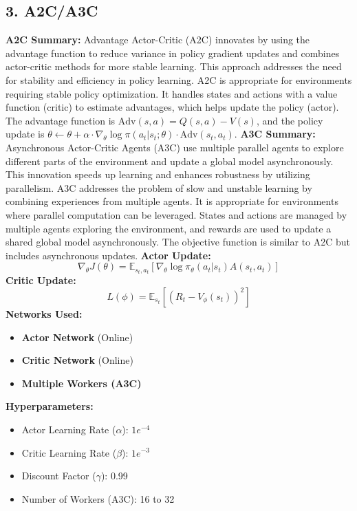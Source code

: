\documentclass[a4paper,10pt]{article}
\begin{document}
\begin{multicols}{2}
\section*{3. A2C/A3C}
\textbf{A2C Summary:} Advantage Actor-Critic (A2C) innovates by using the advantage function to reduce variance in policy gradient updates and combines actor-critic methods for more stable learning. This approach addresses the need for stability and efficiency in policy learning. A2C is appropriate for environments requiring stable policy optimization. It handles states and actions with a value function (critic) to estimate advantages, which helps update the policy (actor). The advantage function is \( \text{Adv}(s, a) = Q(s, a) - V(s) \), and the policy update is \( \theta \leftarrow \theta + \alpha \cdot \nabla_\theta \log \pi(a_t | s_t; \theta) \cdot \text{Adv}(s_t, a_t) \).
\textbf{A3C Summary:} Asynchronous Actor-Critic Agents (A3C) use multiple parallel agents to explore different parts of the environment and update a global model asynchronously. This innovation speeds up learning and enhances robustness by utilizing parallelism. A3C addresses the problem of slow and unstable learning by combining experiences from multiple agents. It is appropriate for environments where parallel computation can be leveraged. States and actions are managed by multiple agents exploring the environment, and rewards are used to update a shared global model asynchronously. The objective function is similar to A2C but includes asynchronous updates.
\textbf{Actor Update:}
\[
\nabla_\theta J(\theta) = \mathbb{E}_{s_t, a_t} \left[ \nabla_\theta \log \pi_\theta(a_t | s_t) A(s_t, a_t) \right]
\]
\textbf{Critic Update:}
\[
L(\phi) = \mathbb{E}_{s_t} \left[ \left( R_t - V_\phi(s_t) \right)^2 \right]
\]
\textbf{Networks Used:}
\begin{itemize}
    \item \textbf{Actor Network} (Online)
    \item \textbf{Critic Network} (Online)
    \item \textbf{Multiple Workers (A3C)}
\end{itemize}
\textbf{Hyperparameters:}
\begin{itemize}
    \item Actor Learning Rate (\(\alpha\)): \(1e^{-4}\)
    \item Critic Learning Rate (\(\beta\)): \(1e^{-3}\)
    \item Discount Factor (\(\gamma\)): 0.99
    \item Number of Workers (A3C): 16 to 32
\end{itemize}


\end{multicols}
\end{document}
